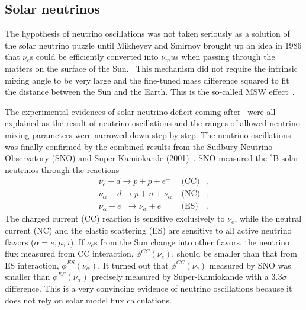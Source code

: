 \subsection{Solar neutrinos}
\label{sec:solar}
The hypothesis of neutrino oscillations was not taken seriously as a
solution of the solar neutrino puzzle until Mikheyev and Smirnov
brought up an idea in 1986 that $\nu_e$s could be efficiently
converted into $\nu_mu$s when passing through the matters on the
surface of the Sun.~\cite{Mik86} This mechanism did not require the
intrinsic mixing angle to be very large and the fine-tuned mass
difference squared to fit the distance between the Sun and the Earth.
This is the so-called MSW effect~\cite{Mik86,Wol78}.

The experimental evidences of solar neutrino deficit coming
after~\cite{Hir89,Aba91,Ans92} were all explained as the result of
neutrino oscillations and the ranges of allowed neutrino mixing
parameters were narrowed down step by step. The neutrino oscillations
was finally confirmed by the combined results from the Sudbury
Neutrino Observatory (SNO) and Super-Kamiokande
(2001)~\cite{Ahm01,Fuk01}. SNO measured the $^8$B solar neutrinos
through the reactions
\begin{eqnarray*}
  \nu_e + d \rightarrow p + p + e^- &\mbox{\ \ \ \ \ \ (CC)}&,\\
  \nu_\alpha + d \rightarrow p + n + \nu_\alpha &\mbox{\ \ \ \ \ \    
(NC)}&,\\
  \nu_\alpha + e^- \rightarrow \nu_\alpha + e^- &\mbox{\ \ \ \ \ \    
(ES)}&.
\end{eqnarray*}
The charged current (CC) reaction is sensitive exclusively to $\nu_e$,
while the neutral current (NC) and the elastic scattering (ES) are
sensitive to all active neutrino flavors ($\alpha = e, \mu, \tau$). If
$\nu_e$s from the Sun change into other flavors, the neutrino flux
measured from CC interaction, $\phi^{CC}(\nu_e)$, should be smaller
than that from ES interaction, $\phi^{ES}(\nu_\alpha)$. It turned out
that $\phi^{CC}(\nu_e)$ measured by SNO was smaller than
$\phi^{ES}(\nu_\alpha)$ precisely measured by Super-Kamiokande with a
$3.3\sigma$ difference. This is a very convincing evidence of neutrino
oscillations because it does not rely on solar model flux
calculations.


